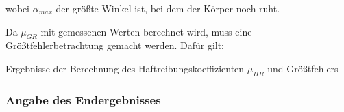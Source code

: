 wobei $\alpha_{max}$ der größte Winkel ist, bei dem der Körper noch ruht.\newline

Da $\mu_{GR}$ mit gemessenen Werten berechnet wird, muss eine Größtfehlerbetrachtung gemacht werden. Dafür gilt:

\begin{table}[h]
  \center 
  \caption[Haftreibungskoeffizienten und Größtfehler]{Ergebnisse der Berechnung des Haftreibungskoeffizienten $\mu_{HR}$ und Größtfehlers}
  
  \label{tab:muGRWerte}
\end{table}

\subsubsection{Angabe des Endergebnisses}